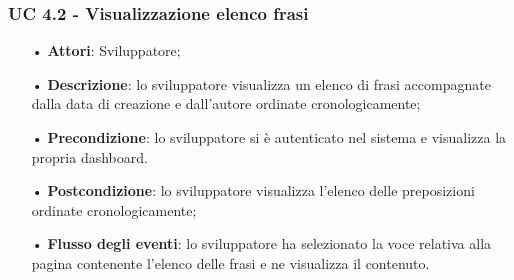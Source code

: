 \subsubsection{UC 4.2 - Visualizzazione elenco frasi}
\begin{itemize}
	\item[•]\textbf{Attori}: Sviluppatore;
	\item[•]\textbf{Descrizione}: lo sviluppatore visualizza un elenco di frasi accompagnate 
	dalla data di creazione e dall’autore ordinate cronologicamente;
	\item[•]\textbf{Precondizione}:  lo sviluppatore si è autenticato nel sistema e visualizza la propria dashboard.
	\item[•]\textbf{Postcondizione}: lo sviluppatore visualizza l'elenco delle preposizioni ordinate cronologicamente;
	\item[•]\textbf{Flusso degli eventi}: lo sviluppatore ha selezionato la voce relativa alla pagina contenente l’elenco delle frasi e ne visualizza il contenuto. 
\end{itemize}
